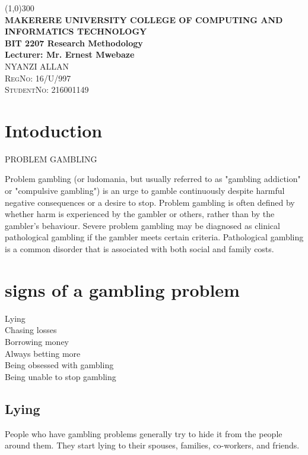 \documentclass{article}
\begin{document}
\begin{titlepage}
\begin{center}
\line(1,0){300}\\
[0.3in]
\huge{\bfseries MAKERERE UNIVERSITY
COLLEGE OF COMPUTING AND INFORMATICS TECHNOLOGY\\
BIT 2207 Research Methodology\\
Lecturer: Mr. Ernest Mwebaze }\\
[1.5cm]
\textsc{\LARGE NYANZI ALLAN\\
RegNo: 16/U/997\\
StudentNo: 216001149}\\
\end{center}
\end{titlepage}
\tableofcontents
\thispagestyle{empty}
\cleardoublepage
\setcounter{page}{1}

\section{Intoduction}\label{sec:intro}
PROBLEM GAMBLING


Problem gambling (or ludomania, but usually referred to as "gambling addiction" or "compulsive gambling") is an urge to gamble continuously despite harmful negative consequences or a desire to stop. Problem gambling is often defined by whether harm is experienced by the gambler or others, rather than by the gambler's behaviour. Severe problem gambling may be diagnosed as clinical pathological gambling if the gambler meets certain criteria. Pathological gambling is a common disorder that is associated with both social and family costs.
\section{signs of a gambling problem}
Lying\\
Chasing losses\\
Borrowing money\\
Always betting more\\
Being obsessed with gambling\\
Being unable to stop gambling

\subsection{Lying}

People who have gambling problems generally try to hide it from the people around them. They start lying to their spouses, families, co-workers, and friends.
\end{document}
